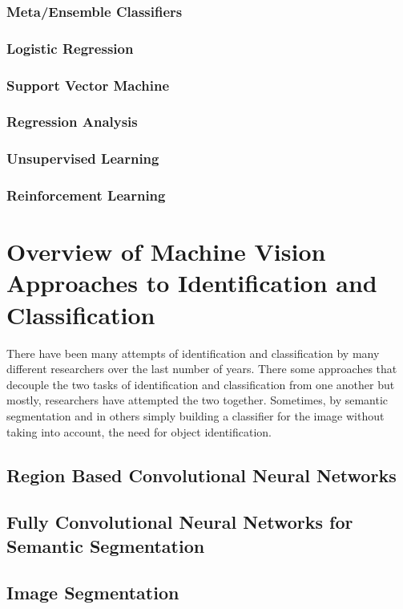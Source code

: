 \subsubsection{Meta/Ensemble Classifiers}
\subsubsection{Logistic Regression}
\subsubsection{Support Vector Machine}
\subsubsection{Regression Analysis}
\subsubsection{Unsupervised Learning}
\subsubsection{Reinforcement Learning}

\section{Overview of Machine Vision Approaches to Identification and Classification}
There have been many attempts of identification and classification by many
different researchers over the last number of years. There some approaches that
decouple the two tasks of identification and classification from one another but
mostly, researchers have attempted the two together. Sometimes, by semantic
segmentation and in others simply building a classifier for the image without
taking into account, the need for object identification.

\subsection{Region Based Convolutional Neural Networks}

\subsection{Fully Convolutional Neural Networks for Semantic Segmentation}
\subsection{Image Segmentation}
